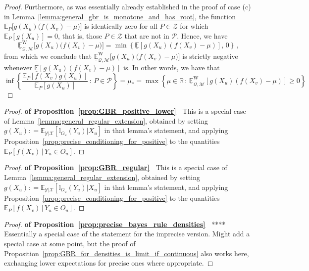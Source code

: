 \documentclass[twoside,11pt]{article}
\newcommand{\reals}{\mathbb{R}}
\newcommand{\states}{\mathcal{X}}
\newcommand{\observs}{\mathcal{Y}}
\newcommand{\lexp}{\underline{\mathbb{E}}_{\rateset,\mathcal{M}}^\mathrm{W}}
\newcommand{\ind}[1]{\mathbb{I}_{#1}}
\newcommand{\rateset}{\mathcal{Q}}
\newcommand{\coloneqq}{:\!=}
\begin{document}
\begin{proof}
Furthermore, as was essentially already established in the proof of case (c) in Lemma~\ref{lemma:general_gbr_is_monotone_and_has_root}, the function $\mathbb{E}_P\bigl[g(X_u)\bigl(f(X_v)-\mu\bigr)\bigr]$ is identically zero for all $P\in\mathcal{Z}$ for which $\mathbb{E}_P[g(X_u)]=0$, that is, those $P\in\mathcal{Z}$ that are not in $\mathcal{P}$. Hence, we have 
\begin{equation*}
\lexp\bigl[g(X_u)\bigl(f(X_v)-\mu\bigr)\bigr] = \min\left\{\underline{\mathbb{E}}[g(X_u)(f(X_v) - \mu)],\,0 \right\}\,,
\end{equation*}
from which we conclude that $\lexp\bigl[g(X_u)\bigl(f(X_v)-\mu\bigr)\bigr]$ is strictly negative whenever $\underline{\mathbb{E}}[g(X_u)(f(X_v) - \mu)]$ is. In other words, we have that
\begin{equation*}
\inf\left\{\frac{\mathbb{E}_P[f(X_v)g(X_u)]}{\mathbb{E}_P[g(X_u)]}\,:\,P\in\mathcal{P}\right\} = \mu_* = \max\left\{ \mu\in\reals\,:\, \lexp[g(X_u)(f(X_v) - \mu)] \geq 0 \right\}
\end{equation*}
\end{proof}

\begin{proof}{\bf of Proposition~\ref{prop:GBR_positive_lower}~}
This is a special case of Lemma~\ref{lemma:general_regular_extension}, obtained by setting $g(X_u)\coloneqq \mathbb{E}_{\observs\vert\states}[\ind{O_u}(Y_u)\vert X_u]$ in that lemma's statement, and applying Proposition~\ref{prop:precise_conditioning_for_positive} to the quantities $\mathbb{E}_P[f(X_v)\,\vert\,Y_u\in O_u]$.
\end{proof}

\begin{proof}{\bf of Proposition~\ref{prop:GBR_regular}~}
This is a special case of Lemma~\ref{lemma:general_regular_extension}, obtained by setting $g(X_u)\coloneqq \mathbb{E}_{\observs\vert\states}[\ind{O_u}(Y_u)\vert X_u]$ in that lemma's statement, and applying Proposition~\ref{prop:precise_conditioning_for_positive} to the quantities $\mathbb{E}_P[f(X_v)\,\vert\,Y_u\in O_u]$.
\end{proof}

\begin{proof}{\bf of Proposition~\ref{prop:precise_bayes_rule_densities}~}
**** Essentially a special case of the statement for the imprecise version. Might add a special case at some point, but the proof of Proposition~\ref{prop:GBR_for_densities_is_limit_if_continuous} also works here, exchanging lower expectations for precise ones where appropriate.
\end{proof}
\end{document}

